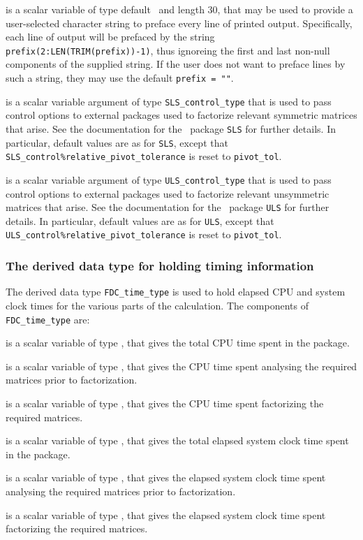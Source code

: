 \documentclass{galahad}
\newcommand{\packagename}{FDC}
\begin{document}
\begin{description}
 is a scalar variable of type default \character\
and length 30, that may be used to provide a user-selected
character string to preface every line of printed output.
Specifically, each line of output will be prefaced by the string
{\tt prefix(2:LEN(TRIM(prefix))-1)},
thus ignoreing the first and last non-null components of the
supplied string. If the user does not want to preface lines by such
a string, they may use the default {\tt prefix = ""}.

 is a scalar variable argument of type
{\tt SLS\_control\_type} that is used to pass control
options to external packages used to
factorize relevant symmetric matrices that arise.
See the documentation for the \galahad\ package {\tt SLS} for further details.
In particular, default values are as for {\tt SLS}, except that
{\tt SLS\_control\%rela\-tive\_pivot\_tolerance} is reset to
{\tt pivot\_tol}.

 is a scalar variable argument of type
{\tt ULS\_control\_type} that is used to pass control
options to external packages used to
factorize relevant unsymmetric matrices that arise.
See the documentation for the \galahad\ package {\tt ULS} for further details.
In particular, default values are as for {\tt ULS}, except that
{\tt ULS\_control\%rela\-tive\_pivot\_tolerance} is reset to
{\tt pivot\_tol}.

\end{description}


\subsubsection{The derived data type for holding timing
 information}\label{typetime}
The derived data type
{\tt \packagename\_time\_type}
is used to hold elapsed CPU and system clock times for the various parts of
the calculation. The components of
{\tt \packagename\_time\_type}
are:
\begin{description}
 is a scalar variable of type \realdp, that gives
 the total CPU time spent in the package.

 is a scalar variable of type \realdp, that gives
 the CPU time spent analysing the required matrices prior to factorization.

 is a scalar variable of type \realdp, that gives
 the CPU time spent factorizing the required matrices.

 is a scalar variable of type \realdp, that gives
 the total elapsed system clock time spent in the package.

 is a scalar variable of type \realdp, that gives
 the elapsed system clock time spent analysing the required matrices prior to
factorization.

 is a scalar variable of type \realdp, that gives
 the elapsed system clock time spent factorizing the required matrices.

\end{description}
\end{document}
